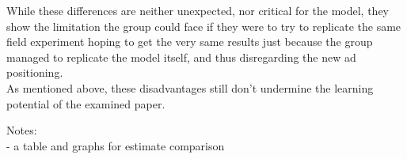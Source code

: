 While these differences are neither unexpected, nor critical for the model, they show the limitation the group could face if they were to try to replicate the same field experiment hoping to get the very same results just because the group managed to replicate the model itself, and thus disregarding the new ad positioning.\\ 
As mentioned above, these disadvantages still don't undermine the learning potential of the examined paper.


Notes:\\
- a table and graphs for estimate comparison\\



